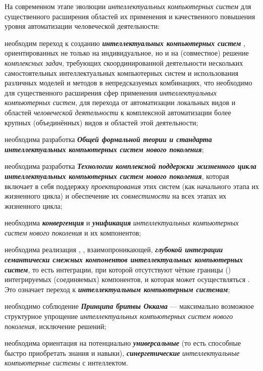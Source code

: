На современном этапе эволюции \textit{интеллектуальных компьютерных систем} для существенного расширения областей их применения и качественного повышения уровня автоматизации человеческой деятельности:
\begin{textitemize}
	\item
	необходим переход к созданию   \textbf{\textit{интеллектуальных компьютерных систем }}, ориентированных не только на индивидуальное, но и на  (совместное) решение \textit{комплексных задач}, требующих скоординированной деятельности нескольких самостоятельных интеллектуальных компьютерных систем и использования различных моделей и методов в непредсказуемых комбинациях, что необходимо для существенного расширения сфер применения \textit{интеллектуальных компьютерных систем}, для перехода от автоматизации локальных видов и областей \textit{человеческой деятельности} к комплексной автоматизации более крупных (объединённых) видов и областей этой деятельности;
	\item
	необходима разработка \textbf{\textit{Общей формальной теории и стандарта интеллектуальных компьютерных систем нового поколения}};
	\item
	необходима разработка \textbf{\textit{Технологии комплексной поддержки жизненного цикла интеллектуальных компьютерных систем нового поколения}}, которая включает в себя поддержку \textit{проектирования} этих систем (как начального этапа их жизненного цикла) и обеспечение их \textit{совместимости} на всех этапах их жизненного цикла;
	\item
	необходима \textbf{\textit{конвергенция}} и \textbf{\textit{унификация}} \textit{интеллектуальных компьютерных систем нового поколения} и их компонентов;
	\item
	необходима реализация , , взаимопроникающей, \textbf{\textit{глубокой интеграции семантически смежных компонентов интеллектуальных компьютерных систем}}, то есть интеграции, при которой отсутствуют чёткие границы () интегрируемых (соединяемых) компонентов, и которая может осуществляться . Это означает переход к \textbf{\textit{ интеллектуальным компьютерным системам}};
	\item
	необходимо соблюдение \textbf{\textit{Принципа бритвы Оккама}} --- максимально возможное структурное упрощение \textit{интеллектуальных компьютерных систем нового поколения}, исключение  решений;
	\item
	необходима ориентация на потенциально \textbf{\textit{универсальные}} (то есть способные быстро приобретать  знания и навыки), \textbf{\textit{синергетические}} \textit{интеллектуальные компьютерные системы} с  интеллектом.
\end{textitemize}

